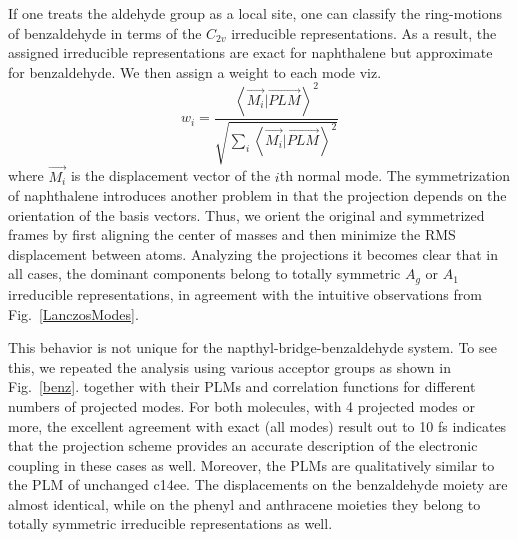 If one treats the aldehyde group as a local site, one can classify the ring-motions of
benzaldehyde in terms of the $C_{2v}$ irreducible representations.
As a result, the assigned irreducible representations are exact for naphthalene but approximate for benzaldehyde.
We then assign a weight to each mode viz.
$$
w_i = \frac{\left\langle \overrightarrow{M_{i}}|\overrightarrow{PLM}\right\rangle ^{2}}{\sqrt{\sum_{i}\left\langle \overrightarrow{M_{i}}|\overrightarrow{PLM}\right\rangle ^{2}}}
$$
where $\overrightarrow{M_{i}}$ is the displacement vector of the $i$th normal mode.
The symmetrization of naphthalene introduces another problem
in that the projection depends on the orientation of the basis vectors.
Thus, we orient the original and symmetrized frames by first aligning the center of masses
and then minimize the RMS displacement between atoms.
Analyzing the projections it becomes clear that in all cases, the dominant components
belong to totally symmetric $A_{g}$ or $A_1$ irreducible representations,  in agreement
with the intuitive observations from Fig.~\ref{LanczosModes}.

This behavior is not unique for the napthyl-bridge-benzaldehyde  system.
To see this, we repeated the analysis using various acceptor groups as shown in Fig.~\ref{benz}.
together with their PLMs and correlation functions for different numbers of projected modes.
For both molecules,  with 4 projected modes or more, the excellent agreement with exact (all modes) result out to 10 fs indicates that
the projection scheme provides an accurate description of the electronic coupling in  these cases as well.
Moreover, the PLMs are qualitatively similar to the PLM of unchanged c14ee.
The displacements on the benzaldehyde moiety are almost identical, while on the phenyl and anthracene moieties they belong to totally symmetric irreducible representations as well.

%



